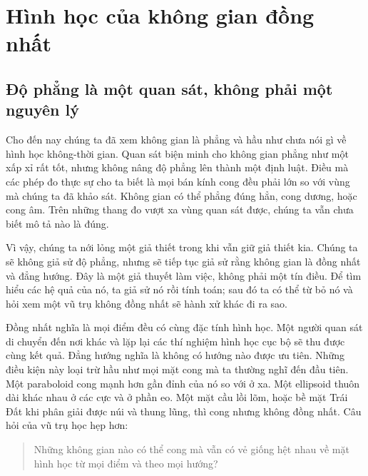 \chapter{Hình học của không gian đồng nhất}


\section{Độ phẳng là một quan sát, không phải một nguyên lý}

Cho đến nay chúng ta đã xem không gian là phẳng và hầu như chưa nói gì về hình học không-thời gian. Quan sát biện minh cho không gian phẳng như một xấp xỉ rất tốt, nhưng không nâng độ phẳng lên thành một định luật. Điều mà các phép đo thực sự cho ta biết là mọi bán kính cong đều phải lớn so với vùng mà chúng ta đã khảo sát. Không gian có thể phẳng đúng hẳn, cong dương, hoặc cong âm. Trên những thang đo vượt xa vùng quan sát được, chúng ta vẫn chưa biết mô tả nào là đúng.

Vì vậy, chúng ta nới lỏng một giả thiết trong khi vẫn giữ giả thiết kia. Chúng ta sẽ không giả sử độ phẳng, nhưng sẽ tiếp tục giả sử rằng không gian là đồng nhất và đẳng hướng. Đây là một giả thuyết làm việc, không phải một tín điều. Để tìm hiểu các hệ quả của nó, ta giả sử nó rồi tính toán; sau đó ta có thể từ bỏ nó và hỏi xem một vũ trụ không đồng nhất sẽ hành xử khác đi ra sao.

Đồng nhất nghĩa là mọi điểm đều có cùng đặc tính hình học. Một người quan sát di chuyển đến nơi khác và lặp lại các thí nghiệm hình học cục bộ sẽ thu được cùng kết quả. Đẳng hướng nghĩa là không có hướng nào được ưu tiên. Những điều kiện này loại trừ hầu như mọi mặt cong mà ta thường nghĩ đến đầu tiên. Một paraboloid cong mạnh hơn gần đỉnh của nó so với ở xa. Một ellipsoid thuôn dài khác nhau ở các cực và ở phần eo. Một mặt cầu lồi lõm, hoặc bề mặt Trái Đất khi phân giải được núi và thung lũng, thì cong nhưng không đồng nhất. Câu hỏi của vũ trụ học hẹp hơn:
\begin{quote}
Những không gian nào có thể cong mà vẫn có vẻ giống hệt nhau về mặt hình học từ mọi điểm và theo mọi hướng?
\end{quote}

